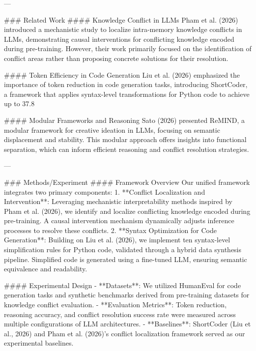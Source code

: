 ---

### Related Work  
#### Knowledge Conflict in LLMs  
Pham et al. (2026) introduced a mechanistic study to localize intra-memory knowledge conflicts in LLMs, demonstrating causal interventions for conflicting knowledge encoded during pre-training. However, their work primarily focused on the identification of conflict areas rather than proposing concrete solutions for their resolution.  

#### Token Efficiency in Code Generation  
Liu et al. (2026) emphasized the importance of token reduction in code generation tasks, introducing ShortCoder, a framework that applies syntax-level transformations for Python code to achieve up to 37.8%

#### Modular Frameworks and Reasoning  
Sato (2026) presented ReMIND, a modular framework for creative ideation in LLMs, focusing on semantic displacement and stability. This modular approach offers insights into functional separation, which can inform efficient reasoning and conflict resolution strategies.

---

### Methods/Experiment  
#### Framework Overview  
Our unified framework integrates two primary components:  
1. **Conflict Localization and Intervention**: Leveraging mechanistic interpretability methods inspired by Pham et al. (2026), we identify and localize conflicting knowledge encoded during pre-training. A causal intervention mechanism dynamically adjusts inference processes to resolve these conflicts.  
2. **Syntax Optimization for Code Generation**: Building on Liu et al. (2026), we implement ten syntax-level simplification rules for Python code, validated through a hybrid data synthesis pipeline. Simplified code is generated using a fine-tuned LLM, ensuring semantic equivalence and readability.  

#### Experimental Design  
- **Datasets**: We utilized HumanEval for code generation tasks and synthetic benchmarks derived from pre-training datasets for knowledge conflict evaluation.  
- **Evaluation Metrics**: Token reduction, reasoning accuracy, and conflict resolution success rate were measured across multiple configurations of LLM architectures.  
- **Baselines**: ShortCoder (Liu et al., 2026) and Pham et al. (2026)'s conflict localization framework served as our experimental baselines.

